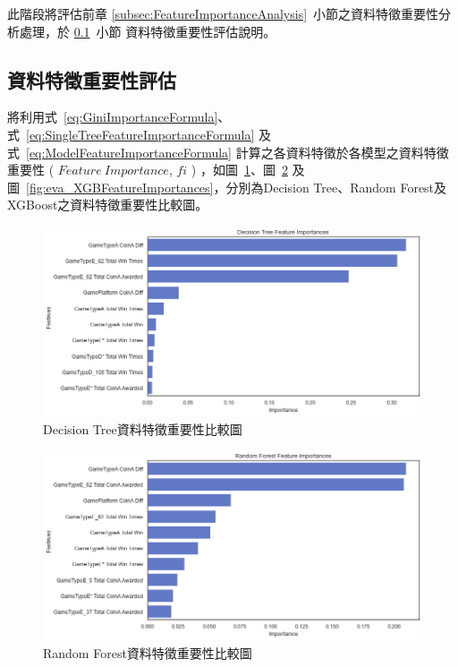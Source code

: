此階段將評估前章 \ref{subsec:FeatureImportanceAnalysis}~小節之資料特徵重要性分析處理，於 \ref{subsec:FeatureImportanceEvaluation}~小節 資料特徵重要性評估說明。

\subsection{資料特徵重要性評估}
\label{subsec:FeatureImportanceEvaluation}

將利用式~\ref{eq:GiniImportanceFormula}、式~\ref{eq:SingleTreeFeatureImportanceFormula} 及式~\ref{eq:ModelFeatureImportanceFormula} 計算之各資料特徵於各模型之資料特徵重要性 ( $Feature\ Importance$, $fi$ ) ，如圖~\ref{fig:eva_DTFeatureImportances}、圖~\ref{fig:eva_RFFeatureImportances} 及圖~\ref{fig:eva_XGBFeatureImportances}，分別為Decision Tree、Random Forest及XGBoost之資料特徵重要性比較圖。

\begin{figure}[!htb]
    \begin{center}
      \includegraphics[width=1\textwidth]{figures/evaluation/Image_DTFeatureImportances.png}
      \caption[Decision Tree資料特徵重要性比較圖]{Decision Tree資料特徵重要性比較圖}
      \label{fig:eva_DTFeatureImportances}
    \end{center}
\end{figure}
\newpage

\begin{figure}[!htb]
    \begin{center}
      \includegraphics[width=1\textwidth]{figures/evaluation/Image_RFFeatureImportances.png}
      \caption[Random Forest資料特徵重要性比較圖]{Random Forest資料特徵重要性比較圖}
      \label{fig:eva_RFFeatureImportances}
    \end{center}
\end{figure}

